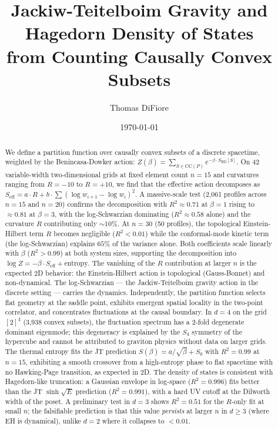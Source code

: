 \documentclass[aps,prd,twocolumn,superscriptaddress]{revtex4-2}
\begin{document}
\title{Jackiw-Teitelboim Gravity and Hagedorn Density of States\\from Counting Causally Convex Subsets}

\author{Thomas DiFiore}

\date{\today}

\begin{abstract}
We define a partition function over causally convex subsets of a
discrete spacetime, weighted by the Benincasa-Dowker action:
$Z(\beta) = \sum_{S \in \mathrm{CC}(P)} e^{-\beta \cdot S_{\mathrm{BD}}[S]}$.
On 42 variable-width two-dimensional grids at fixed element count
$n = 15$ and curvatures ranging from $R = -10$ to $R = +10$, we find
that the effective action decomposes as
$S_{\mathrm{eff}} = a \cdot R + b \cdot \sum (\log w_{i+1} -
\log w_i)^2$. A massive-scale test (2{,}061 profiles across
$n = 15$ and $n = 20$) confirms the decomposition with
$R^2 \approx 0.71$ at $\beta = 1$ rising to $\approx 0.81$ at
$\beta = 3$, with the log-Schwarzian dominating
($R^2 \approx 0.58$ alone) and the curvature $R$ contributing only
$\sim 10\%$. At $n = 30$ (50 profiles), the topological
Einstein-Hilbert term $R$ becomes negligible ($R^2 < 0.01$) while
the conformal-mode kinetic term (the log-Schwarzian) explains
$65\%$ of the variance alone. Both coefficients scale linearly with
$\beta$ ($R^2 > 0.99$) at both system sizes, supporting the
decomposition into
$\log Z = -\beta \cdot S_{\mathrm{eff}} + \mathrm{entropy}$.
The vanishing of the $R$ contribution at larger $n$ is the expected
2D behavior: the Einstein-Hilbert action is topological
(Gauss-Bonnet) and non-dynamical. The log-Schwarzian --- the
Jackiw-Teitelboim gravity action in the discrete setting --- carries
the dynamics.
Independently, the partition function selects flat geometry at the
saddle point, exhibits emergent spatial locality in the two-point
correlator, and concentrates fluctuations at the causal boundary.
In $d = 4$ on the grid $[2]^4$ (3{,}938 convex subsets), the
fluctuation spectrum has a 2-fold degenerate dominant eigenmode;
this degeneracy is explained by the $S_4$ symmetry of the hypercube
and cannot be attributed to graviton physics without data on larger
grids. The thermal entropy fits the JT prediction $S(\beta) =
a/\sqrt{\beta} + S_0$ with $R^2 = 0.99$ at $n = 15$, exhibiting
a smooth crossover from a high-entropy phase to flat spacetime with
no Hawking-Page transition, as expected in 2D.
The density of states is consistent with Hagedorn-like truncation: a Gaussian envelope
in log-space ($R^2 = 0.996$) fits better than the JT
$\sinh\sqrt{E}$ prediction ($R^2 = 0.991$), with a hard UV cutoff
at the Dilworth width of the poset.
A preliminary test in $d = 3$ shows $R^2 = 0.51$ for the $R$-only
fit at small $n$; the falsifiable prediction is that this value
\emph{persists} at larger $n$ in $d \geq 3$ (where EH is dynamical),
unlike $d = 2$ where it collapses to $< 0.01$.
\end{abstract}
\end{document}
